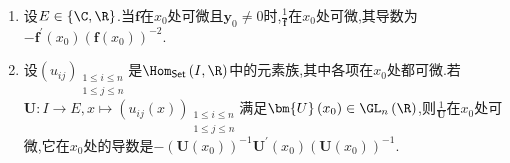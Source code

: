 \begin{example}{}{}
	\begin{enumerate}
		\item 设$E\in\left\{\C,\R\right\}$.当$\mathbf{f}$在$x_{0}$处可微且$\mathbf{y}_{0}\neq 0$时,$\frac{1}{\mathbf{f}}$在$x_{0}$处可微,其导数为$-\mathbf{f}^{\prime}\left(x_{0}\right)\left(\mathbf{f}\left(x_{0}\right)\right)^{-2}$.
		\item 设$\left(u_{ij}\right)_{\substack{1\leq i\leq n\\ 1\leq j\leq n}}$是$\Hom_{\mathsf{Set}}\left(I,\R\right)$中的元素族,其中各项在$x_{0}$处都可微.若$\bm{U}:I\to E,x\mapsto\left(u_{ij}\left(x\right)\right)_{\substack{1\leq i\leq n\\ 1\leq j\leq n}}$满足$\bm{U}\left(x_{0}\right)\in\GL_{n}\left(\R\right)$,则$\frac{1}{\bm{U}}$在$x_{0}$处可微,它在$x_{0}$处的导数是$-\left(\bm{U}\left(x_{0}\right)\right)^{-1}\bm{U}^{\prime}\left(x_{0}\right)\left(\bm{U}\left(x_{0}\right)\right)^{-1}$.
	\end{enumerate}
\end{example}
































